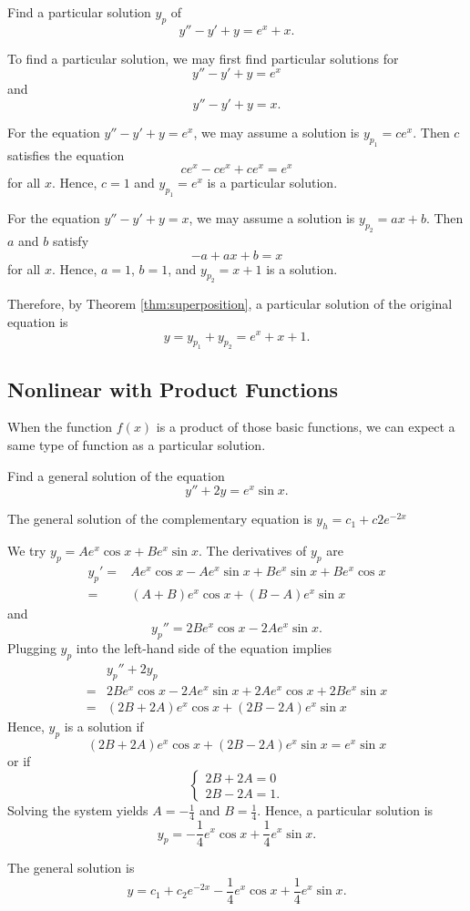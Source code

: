 \begin{exercise}
  Find a particular solution $y_p$ of 
\[y'' - y' +  y = e^x + x.\]
\end{exercise}
\begin{exersol}
  To find a particular solution, we may first find particular solutions for
  \[y'' - y' +  y = e^x\]
  and
  \[y'' - y' +  y = x.\]

  For the equation $y'' - y' +  y = e^x$, we may assume a solution is $y_{p_1}=ce^x$. Then $c$ satisfies the equation
  \[ce^x-ce^x+ce^x=e^x\]
  for all $x$.
  Hence, $c=1$ and $y_{p_1}=e^x$ is a particular solution.

  For the equation $y''-y'+y=x$, we may assume a solution is $y_{p_2}=ax+b$. Then $a$ and $b$ satisfy
  \[-a+ax+b=x\]
  for all $x$.
  Hence, $a=1$, $b=1$, and $y_{p_2}=x+1$ is a solution.

  Therefore, by Theorem \ref{thm:superposition}, a particular solution of the original equation is
  \[y=y_{p_1}+y_{p_2}=e^x+x+1.\]
\end{exersol}

\subsection{Nonlinear with Product Functions}

When the function $f(x)$ is a product of those basic functions, we can expect a same type of function as a particular solution.

\begin{example}
Find a general solution of the equation 
\[y'' + 2 y = e^x \sin x.\]
\end{example}
\begin{solution}
The general solution of the complementary equation is $y_h=c_1+c2e^{-2x}$

We try $y_p = A e^x \cos x + B e^x \sin x$. The derivatives of $y_p$ are
\[ 
\begin{split}
y_p' =& A e^x \cos x - A e^x \sin x + B e^x \sin x  + B e^x \cos x  \\
= &(A+B) e^x \cos x  + (B-A) e^x \sin x
\end{split}
\]
and
\[  y_p'' = 2B e^x \cos x -2A e^x \sin x.\]
Plugging $y_p$ into the left-hand side of the equation implies
\[ 
\begin{split}
  & y_p'' + 2 y_p \\
= & 2B e^x \cos x -2A e^x \sin x   + 2 A e^x \cos x +2 B e^x \sin x \\
=&  (2B+ 2A) e^x \cos x  + (2B- 2A) e^x \sin x
\end{split}
\]
Hence, $y_p$ is a solution if 
\[ (2B+ 2A) e^x \cos x  + (2B- 2A) e^x \sin x = e^x \sin x\]
or if
\[
\begin{cases}
2B+2A =0\\
2B-2A =1.
\end{cases}
\]
Solving the system yields
$A= -\frac{1}{4} $ and $B= \frac{1}{4}$.
Hence, a particular solution is
\[y_p =  -\frac{1}{4} e^x \cos x +  \frac{1}{4} e^x \sin x.\]

The general solution is
\[y=c_1+c_2e^{-2x}-\frac{1}{4} e^x \cos x +  \frac{1}{4} e^x \sin x.\]
\end{solution}

